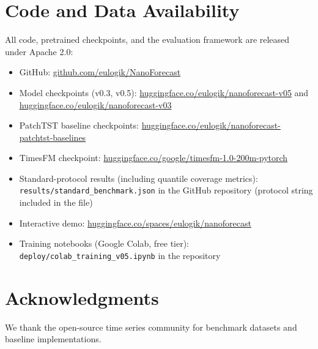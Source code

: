 \documentclass[11pt]{article}
\begin{document}
\section*{Code and Data Availability}

All code, pretrained checkpoints, and the evaluation framework are released under Apache 2.0:

\begin{itemize}
\item GitHub: \href{https://github.com/eulogik/NanoForecast}{github.com/eulogik/NanoForecast}
\item Model checkpoints (v0.3, v0.5): \href{https://huggingface.co/eulogik/nanoforecast-v05}{huggingface.co/eulogik/nanoforecast-v05} and \href{https://huggingface.co/eulogik/nanoforecast-v03}{huggingface.co/eulogik/nanoforecast-v03}
\item PatchTST baseline checkpoints: \href{https://huggingface.co/eulogik/nanoforecast-patchtst-baselines}{huggingface.co/eulogik/nanoforecast-patchtst-baselines}
\item TimesFM checkpoint: \href{https://huggingface.co/google/timesfm-1.0-200m-pytorch}{huggingface.co/google/timesfm-1.0-200m-pytorch}
\item Standard-protocol results (including quantile coverage metrics): \texttt{results/standard\_benchmark.json} in the GitHub repository (protocol string included in the file)
\item Interactive demo: \href{https://huggingface.co/spaces/eulogik/nanoforecast}{huggingface.co/spaces/eulogik/nanoforecast}
\item Training notebooks (Google Colab, free tier): \texttt{deploy/colab\_training\_v05.ipynb} in the repository
\end{itemize}

\section*{Acknowledgments}
We thank the open-source time series community for benchmark datasets and baseline implementations.
\end{document}
